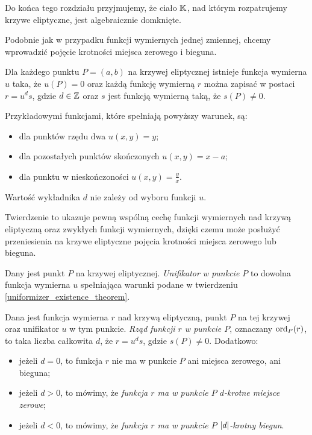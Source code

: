 \begin{remark}
Do końca tego rozdziału przyjmujemy,
że ciało $\mathbb{K}$, nad którym rozpatrujemy krzywe eliptyczne,
jest algebraicznie domknięte.
\end{remark}

Podobnie jak w przypadku funkcji wymiernych jednej zmiennej,
chcemy wprowadzić pojęcie krotności miejsca zerowego i bieguna.

\begin{theorem}\label{uniformizer_existence_theorem}
Dla każdego punktu $P = (a, b)$ na krzywej eliptycznej
istnieje funkcja wymierna $u$ taka, że $u(P) = 0$
oraz każdą funkcję wymierną $r$ można zapisać w postaci $r = u^ds$,
gdzie $d \in \mathbb{Z}$ oraz $s$ jest funkcją wymierną taką, że $s(P) \neq 0$.

Przykładowymi funkcjami, które spełniają powyższy warunek, są:
\begin{itemize}
\item dla punktów rzędu dwa $u(x, y) = y$;
\item dla pozostałych punktów skończonych $u(x, y) = x - a$;
\item dla punktu w nieskończoności $u(x, y) = \frac{y}{x}$.
\end{itemize}

Wartość wykładnika $d$ nie zależy od wyboru funkcji $u$.
\end{theorem}

Twierdzenie to ukazuje pewną wspólną cechę
funkcji wymiernych nad krzywą eliptyczną
oraz zwykłych funkcji wymiernych,
dzięki czemu może posłużyć przeniesienia na krzywe eliptyczne
pojęcia krotności miejsca zerowego lub bieguna.

\begin{definition}
Dany jest punkt $P$ na krzywej eliptycznej.
\emph{Unifikator w punkcie $P$}
to dowolna funkcja wymierna $u$
spełniająca warunki podane w twierdzeniu \ref{uniformizer_existence_theorem}.
\end{definition}

\begin{definition}
Dana jest funkcja wymierna $r$ nad krzywą eliptyczną,
punkt $P$ na tej krzywej oraz unifikator $u$ w tym punkcie.
\emph{Rząd funkcji $r$ w punkcie $P$},
oznaczany $\operatorname{ord}_P(r)$,
to taka liczba całkowita $d$,
że $r = u^ds$, gdzie $s(P) \neq 0$.
Dodatkowo:
\begin{itemize}
\item jeżeli $d = 0$,
to funkcja $r$ nie ma w punkcie $P$ ani miejsca zerowego, ani bieguna;
\item jeżeli $d > 0$, to mówimy,
że \emph{funkcja $r$ ma w punkcie $P$ $d$-krotne miejsce zerowe};
\item jeżeli $d < 0$, to mówimy,
że \emph{funkcja $r$ ma w punkcie $P$ $\lvert d\rvert$-krotny biegun}.
\end{itemize}
\end{definition}


